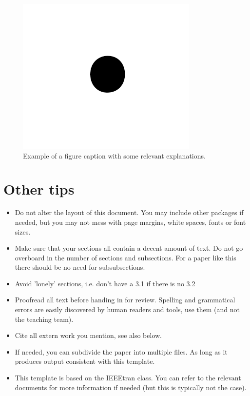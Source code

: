 \documentclass[conference]{IEEEtran}
\begin{document}
\begin{figure}[tbp]
\centerline{\includegraphics{fig1.png}}
\caption{Example of a figure caption with some relevant explanations.}
\label{fig}
\end{figure}

\section{Other tips}\label{othertips}

\begin{itemize}
\item Do not alter the layout of this document. You may include other packages if needed, but you may not mess with page margins, white spaces, fonts or font sizes. 
\item Make sure that your sections all contain a decent amount of text. Do not go overboard in the number of sections and subsections. For a paper like this there should be no need for subsubsections. 
\item Avoid 'lonely' sections, i.e. don't have a 3.1 if there is no 3.2 
\item Proofread all text before handing in for review. Spelling and grammatical errors are easily discovered by human readers and tools, use them (and not the teaching team). 
\item Cite all extern work you mention, see also below.
\item If needed, you can subdivide the paper into multiple files. As long as it produces output consistent with this template.
\item This template is based on the IEEEtran class. You can refer to the relevant documents for more information if needed (but this is typically not the case).

\end{itemize}
\end{document}
